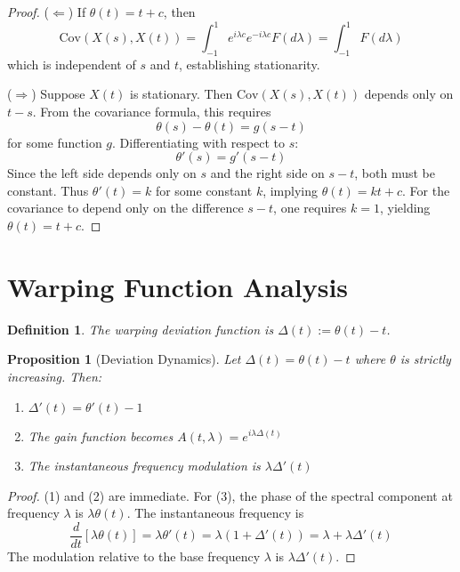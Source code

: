 \documentclass[11pt]{article}
\newtheorem{proposition}{Proposition}
\newtheorem{definition}{Definition}
\begin{document}
\begin{proof}
($\Leftarrow$) If $\theta(t) = t + c$, then
\begin{equation}
\text{Cov}(X(s),X(t)) = \int_{-1}^1 e^{i\lambda c} e^{-i\lambda c} F(d\lambda) = \int_{-1}^1 F(d\lambda)
\end{equation}
which is independent of $s$ and $t$, establishing stationarity.

($\Rightarrow$) Suppose $X(t)$ is stationary. Then $\text{Cov}(X(s),X(t))$ depends only on $t-s$. From the covariance formula, this requires
\begin{equation}
\theta(s) - \theta(t) = g(s-t)
\end{equation}
for some function $g$. Differentiating with respect to $s$:
\begin{equation}
\theta'(s) = g'(s-t)
\end{equation}
Since the left side depends only on $s$ and the right side on $s-t$, both must be constant. Thus $\theta'(t) = k$ for some constant $k$, implying $\theta(t) = kt + c$. For the covariance to depend only on the difference $s-t$, one requires $k = 1$, yielding $\theta(t) = t + c$.
\end{proof}

\section{Warping Function Analysis}

\begin{definition}
The \emph{warping deviation function} is $\Delta(t) := \theta(t) - t$.
\end{definition}

\begin{proposition}[Deviation Dynamics]
Let $\Delta(t) = \theta(t) - t$ where $\theta$ is strictly increasing. Then:
\begin{enumerate}
\item $\Delta'(t) = \theta'(t) - 1$
\item The gain function becomes $A(t,\lambda) = e^{i\lambda\Delta(t)}$
\item The instantaneous frequency modulation is $\lambda\Delta'(t)$
\end{enumerate}
\end{proposition}

\begin{proof}
(1) and (2) are immediate. For (3), the phase of the spectral component at frequency $\lambda$ is $\lambda\theta(t)$. The instantaneous frequency is
\begin{equation}
\frac{d}{dt}[\lambda\theta(t)] = \lambda\theta'(t) = \lambda(1 + \Delta'(t)) = \lambda + \lambda\Delta'(t)
\end{equation}
The modulation relative to the base frequency $\lambda$ is $\lambda\Delta'(t)$.
\end{proof}
\end{document}
